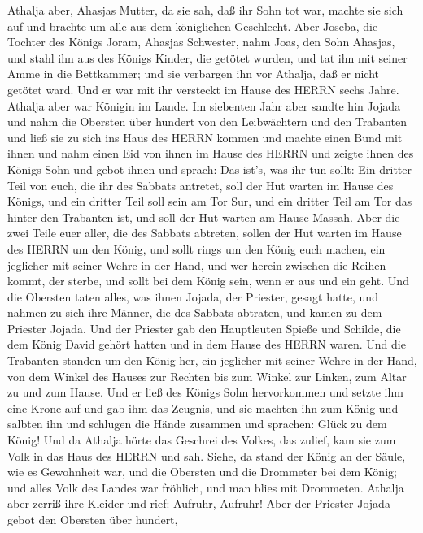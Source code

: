  Athalja aber, Ahasjas Mutter, da sie sah, daß ihr Sohn tot
war, machte sie sich auf und brachte um alle aus dem königlichen
Geschlecht.  Aber Joseba, die Tochter des Königs Joram,
Ahasjas Schwester, nahm Joas, den Sohn Ahasjas, und stahl ihn aus des
Königs Kinder, die getötet wurden, und tat ihn mit seiner Amme in die
Bettkammer; und sie verbargen ihn vor Athalja, daß er nicht getötet
ward.  Und er war mit ihr versteckt im Hause des HERRN sechs
Jahre. Athalja aber war Königin im Lande.  Im siebenten Jahr
aber sandte hin Jojada und nahm die Obersten über hundert von den
Leibwächtern und den Trabanten und ließ sie zu sich ins Haus des HERRN
kommen und machte einen Bund mit ihnen und nahm einen Eid von ihnen im
Hause des HERRN und zeigte ihnen des Königs Sohn  und gebot
ihnen und sprach: Das ist's, was ihr tun sollt: Ein dritter Teil von
euch, die ihr des Sabbats antretet, soll der Hut warten im Hause des
Königs,  und ein dritter Teil soll sein am Tor Sur, und ein
dritter Teil am Tor das hinter den Trabanten ist, und soll der Hut
warten am Hause Massah.  Aber die zwei Teile euer aller, die
des Sabbats abtreten, sollen der Hut warten im Hause des HERRN um den
König,  und sollt rings um den König euch machen, ein
jeglicher mit seiner Wehre in der Hand, und wer herein zwischen die
Reihen kommt, der sterbe, und sollt bei dem König sein, wenn er aus und
ein geht.  Und die Obersten taten alles, was ihnen Jojada,
der Priester, gesagt hatte, und nahmen zu sich ihre Männer, die des
Sabbats abtraten, und kamen zu dem Priester Jojada.  Und
der Priester gab den Hauptleuten Spieße und Schilde, die dem König David
gehört hatten und in dem Hause des HERRN waren.  Und die
Trabanten standen um den König her, ein jeglicher mit seiner Wehre in
der Hand, von dem Winkel des Hauses zur Rechten bis zum Winkel zur
Linken, zum Altar zu und zum Hause.  Und er ließ des Königs
Sohn hervorkommen und setzte ihm eine Krone auf und gab ihm das Zeugnis,
und sie machten ihn zum König und salbten ihn und schlugen die Hände
zusammen und sprachen: Glück zu dem König!  Und da Athalja
hörte das Geschrei des Volkes, das zulief, kam sie zum Volk in das Haus
des HERRN  und sah. Siehe, da stand der König an der Säule,
wie es Gewohnheit war, und die Obersten und die Drommeter bei dem König;
und alles Volk des Landes war fröhlich, und man blies mit Drommeten.
Athalja aber zerriß ihre Kleider und rief: Aufruhr, Aufruhr!
 Aber der Priester Jojada gebot den Obersten über hundert,
